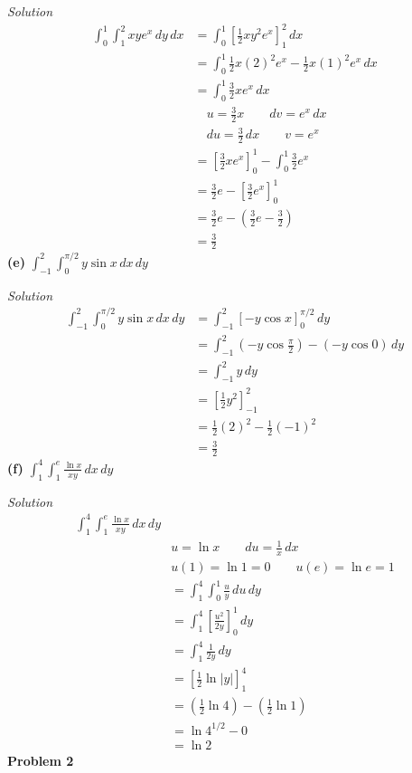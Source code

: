 \documentclass{article}
\newcommand{\lrp}[1]{\left( #1 \right)}
\newcommand{\lrb}[1]{\left[ #1 \right]}
\newcommand{\Solution}{\textit{Solution}}
\begin{document}
\Solution
\begin{align*}
    \int_0^1\int_1^2xye^x\,dy\,dx&=\int_0^1\lrb{\frac{1}{2}xy^2e^x}_1^2\,dx\\
    &=\int_0^1\frac{1}{2}x(2)^2e^x-\frac{1}{2}x(1)^2e^x\,dx\\
    &=\int_0^1\frac{3}{2}xe^x\, dx\\
    &\hspace{1em}u=\frac{3}{2}x \hspace{2em}dv=e^x\,dx\\
    &\hspace{1em}du=\frac{3}{2}\,dx\hspace{2em}v=e^x\\
    &=\lrb{\frac{3}{2}xe^x}_0^1-\int_0^1\frac{3}{2}e^x\\
    &=\frac{3}{2}e-\lrb{\frac{3}{2}e^x}_0^1\\
    &=\frac{3}{2}e-\lrp{\frac{3}{2}e-\frac{3}{2}}\\
    &=\boxed{\frac{3}{2}}
\end{align*}
\newpage
\textbf{(e)} $\displaystyle \int_{-1}^2\int_0^{\pi/2}y\sin x\,dx\,dy$

\Solution
\begin{align*}
    \int_{-1}^2\int_0^{\pi/2}y\sin x\,dx\,dy&=\int_{-1}^2\lrb{-y\cos x}_0^{\pi/2}\,dy\\
    &=\int_{-1}^2\lrp{-y\cos\frac{\pi}{2}}-\lrp{-y\cos0}\,dy\\
    &=\int_{-1}^2 y\,dy\\
    &=\lrb{\frac{1}{2}y^2}_{-1}^2\\
    &=\frac{1}{2}(2)^2-\frac{1}{2}(-1)^2\\
    &=\boxed{\frac{3}{2}}
\end{align*}
\textbf{(f)} $\displaystyle \int_1^4\int_1^e\frac{\ln x}{xy}\,dx\,dy$

\Solution
\begin{align*}
    \int_1^4\int_1^e\frac{\ln x}{xy}\,dx\,dy\\
    &u=\ln x \hspace{2em} du=\frac{1}{x}\,dx\\
    &u(1)=\ln 1 = 0\hspace{2em}u(e)=\ln e= 1\\
    &=\int_1^4\int_0^1 \frac{u}{y}\,du\,dy\\
    &=\int_1^4\lrb{\frac{u^2}{2y}}_0^1\,dy\\
    &=\int_1^4\frac{1}{2y}\,dy\\
    &=\lrb{\frac{1}{2}\ln\left|y\right|}_1^4\\
    &=\lrp{\frac{1}{2}\ln 4}-\lrp{\frac{1}{2}\ln 1}\\
    &=\ln 4^{1/2}-0\\
    &=\boxed{\ln 2}
\end{align*}
\newpage
\textbf{Problem 2}
\end{document}
